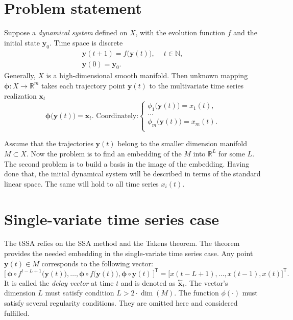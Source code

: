 \documentclass[referee, pdflatex, sn-mathphys-num]{sn-jnl}
\theoremstyle{definition}
\theoremstyle{plain}
\newcommand{\delayV}[1]{\overset{\leftarrow}{\mathbf{x}}_{#1}}
\begin{document}
	\section{Problem statement}\label{sec:problem_statement}
	
	Suppose a \emph{dynamical system} defined on $ X $, with the evolution function $ f $ and the initial state $ \mathbf{y}_0 $. Time space is discrete \begin{gather*}
		\mathbf{y}(t + 1) = f \bigl( \mathbf{y}(t) \bigr), \quad \ t \in \mathbb{N}, \\
		\mathbf{y}(0) = \mathbf{y}_0 .
	\end{gather*} Generally, $ X $ is a high-dimensional smooth manifold. Then unknown mapping $ \boldsymbol{\phi}: X \to \mathbb{R}^m $ takes each trajectory point $ \mathbf{y}(t) $ to the multivariate time series realization $ \mathbf{x}_t $ \begin{equation*}
		\boldsymbol{\phi} \bigl( \mathbf{y}(t) \bigr) = \mathbf{x}_t. \text{ Coordinately:} \begin{cases}
			\phi_1 \bigl( \mathbf{y}(t) \bigr) = x_1(t), \\
			\ldots \\
			\phi_m \bigl( \mathbf{y}(t) \bigr) = x_m(t). \\
		\end{cases}
	\end{equation*}
	
	Assume that the trajectories $ \mathbf{y}(t) $ belong to the smaller dimension manifold $ M \subset X $. Now the problem is to find an embedding of the $ M $ into $ \mathbb{R}^{L} $ for some $ L $. The second problem is to build a basis in the image of the embedding. Having done that, the initial dynamical system will be described in terms of the standard linear space. The same will hold to all time series $ x_i(t) $.

	\section{Single-variate time series case}\label{sec:one_series}
	
	The tSSA relies on the SSA method and the Takens theorem. The theorem provides the needed embedding in the single-variate time series case. Any point $ \mathbf{y}(t) \in M $ corresponds to the following vector: \begin{equation*}
		\bigl[ \, \boldsymbol{\phi} \circ f^{t - L + 1} \bigl( \mathbf{y}(t) \bigr), \ldots , \boldsymbol{\phi} \circ f \bigl( \mathbf{y}(t) \bigr), \boldsymbol{\phi} \circ \mathbf{y}(t) \, \bigr]^{\mathsf{T}} = \bigl[ x(t - L + 1), \ldots , x(t-1), x(t) \bigr]^{\mathsf{T}}.
	\end{equation*}	It is called the \emph{delay vector} at time $ t $ and is denoted as $ \delayV{t} $. The vector's dimension $ L $ must satisfy condition $ L > 2 \cdot \dim(M) $. The function $ \phi(\cdot) $ must satisfy several regularity conditions. They are omitted here and considered fulfilled.
	
\end{document}
